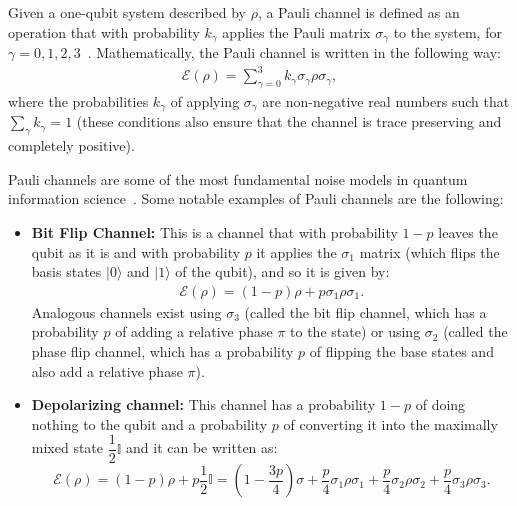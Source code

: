 \documentclass[10pt,letterpaper]{article} %
\begin{document}
Given a one-qubit system described by $\rho$, 
a Pauli channel is defined as an operation that with probability $k_{\gamma}$
applies the Pauli matrix $\sigma_{\gamma}$ to
the system, for $\gamma = 0,1,2,3$~\cite{geometry}.
Mathematically, the Pauli channel is written in the following way:
\begin{eqnarray}
\label{eq: Pauli channel 1 qbit}
\mathcal{E}(\rho) = \sum_{\gamma=0}^3 k_{\gamma} \sigma_{\gamma} \rho \sigma_{\gamma},
\end{eqnarray} 
where the probabilities $k_{\gamma}$ of applying $\sigma_{\gamma}$
are non-negative real numbers such that 
$\sum_{\gamma} k_{\gamma} = 1$ (these conditions also ensure that the channel is 
trace preserving and completely positive).

Pauli channels are some of the 
most fundamental noise models in quantum information science~\cite{Terhal}. 
Some notable examples of Pauli channels are the following:
\begin{itemize}
\item \textbf{Bit Flip Channel:} This is a channel that with probability $1-p$ leaves the qubit as it is 
and with probability $p$ it applies the $\sigma_1$ matrix 
(which flips the basis states $|0\rangle$ and $|1\rangle$ of the qubit), and
so it is given by:
\begin{align*}
\mathcal{E}(\rho) = (1-p) \rho + p \sigma_1 \rho \sigma_1.
\end{align*}
Analogous channels exist using $\sigma_3$ (called the bit flip channel,
which has a probability $p$ of adding a relative phase $\pi$ to the state) or 
using $\sigma_2$ (called the phase flip channel, 
which has a probability $p$ of 
flipping the base states and also add a relative phase $\pi$).
\item \textbf{Depolarizing channel:} 
This channel has a probability $1-p$
of doing nothing to the qubit and a probability $p$ of converting it into the maximally mixed state $\dfrac{1}{2} \mathbb{I}$
and it can be written as:
\begin{equation}
\mathcal{E}(\rho) = (1-p)\rho + p \dfrac{1}{2} \mathbb{I} = \left(1 - \dfrac{3p}{4} \right) \sigma + \dfrac{p}{4} \sigma_1 \rho \sigma_1 + \dfrac{p}{4} \sigma_2 \rho \sigma_2+ \dfrac{p}{4} \sigma_3 \rho \sigma_3.
\end{equation} 
\end{itemize}
\end{document}
